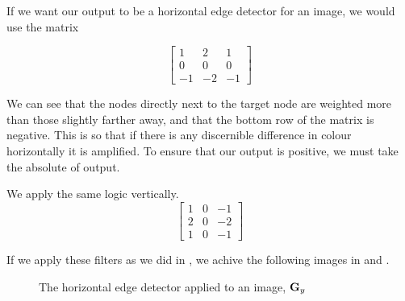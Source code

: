 

If we want our output to be a horizontal edge detector for an image, we would use the matrix

\begin{equation}
\begin{bmatrix}
1 & 2 & 1 \\
0 & 0 & 0 \\
-1 & -2 & -1
\end{bmatrix}
\end{equation}

We can see that the nodes directly next to the target node are weighted more than those slightly farther away, and that the bottom row of the matrix is negative. 
This is so that if there is any discernible difference in colour horizontally it is amplified. To ensure that our output is positive, we must take the absolute of output. 

We apply the same logic vertically.
\begin{equation}
\begin{bmatrix}
1 & 0 & -1 \\
2 & 0 & -2 \\
1 & 0 & -1
\end{bmatrix}
\end{equation}

If we apply these filters as we did in , we achive the following images in  and .

\begin{figure}[h]
\setlength{\unitlength}{0.14in}
\centering

\caption{The horizontal edge detector applied to an image, $\bold{G}_y$}
\label{fig:hedge}
\end{figure}

